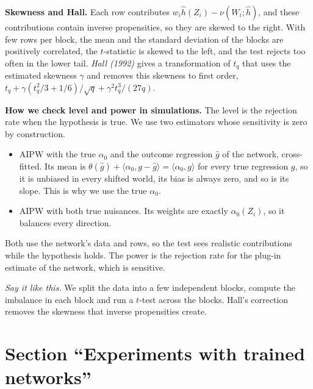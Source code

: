 \documentclass[10pt]{article}
\newcommand{\say}[1]{\par\textit{Say it like this.} #1\par}
\begin{document}
\textbf{Skewness and Hall.} Each row contributes $w_i\hat h(Z_i)-\nu(W_i;\hat h)$, and these contributions contain
inverse propensities, so they are skewed to the right. With few rows per block, the mean and the standard deviation
of the blocks are positively correlated, the $t$-statistic is skewed to the left, and the test rejects too often in the
lower tail. \textit{Hall (1992)} gives a transformation of $t_q$ that uses the estimated skewness $\gamma$ and removes
this skewness to first order, $t_q+\gamma(t_q^2/3+1/6)/\sqrt q+\gamma^2t_q^3/(27q)$.

\textbf{How we check level and power in simulations.} The level is the rejection rate when the hypothesis is true. We
use two estimators whose sensitivity is zero by construction.
\begin{itemize}
\item AIPW with the true $\alpha_0$ and the outcome regression $\hat g$ of the network, cross-fitted. Its mean is
$\theta(\hat g)+\langle\alpha_0,g-\hat g\rangle=\langle\alpha_0,g\rangle$ for every true regression $g$, so it is
unbiased in every shifted world, its bias is always zero, and so is its slope. This is why we use the true $\alpha_0$.
\item AIPW with both true nuisances. Its weights are exactly $\alpha_0(Z_i)$, so it balances every direction.
\end{itemize}
Both use the network's data and rows, so the test sees realistic contributions while the hypothesis holds. The power is
the rejection rate for the plug-in estimate of the network, which is sensitive.
\say{We split the data into a few independent blocks, compute the imbalance in each block and run a $t$-test across the
blocks. Hall's correction removes the skewness that inverse propensities create.}

\section*{Section ``Experiments with trained networks''}
\end{document}
